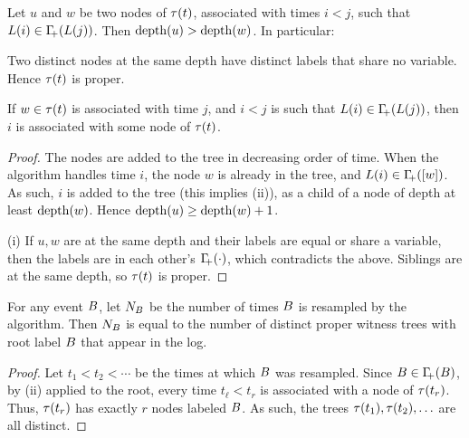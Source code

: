 \begin{lemma}
    Let $u$ and $w$ be two nodes of $\WTreeX{t}$, associated with times
    $i<j$, such that $\ELogX{i} \in \NbrCX{\ELogX{j}}$. Then
    $\nodeDepthX{u} > \nodeDepthX{w}$. In particular:
    \begin{compactenumi}
        \item Two distinct nodes at the same depth have distinct
        labels that share no variable. Hence $\WTreeX{t}$ is proper.

        \item If $w \in \WTreeX{t}$ is associated with time $j$, and
        $i < j$ is such that $\ELogX{i} \in \NbrCX{\ELogX{j}}$, then $i$
        is associated with some node of $\WTreeX{t}$.
    \end{compactenumi}
\end{lemma}

\begin{proof}
    The nodes are added to the tree in decreasing order of time. When
    the algorithm handles time $i$, the node $w$ is already in the
    tree, and $\ELogX{i} \in \NbrCX{\LabelX{w}}$. As such, $i$ is
    added to the tree (this implies (ii)), as a child of a node of
    depth at least $\nodeDepthX{w}$. Hence
    $\nodeDepthX{u} \geq \nodeDepthX{w}+1$.

    (i) If $u, w$ are at the same depth and their labels are equal
    or share a variable, then the labels are in each other's
    $\NbrCX{\cdot}$, which contradicts the above. Siblings are at the
    same depth, so $\WTreeX{t}$ is proper.
\end{proof}

\begin{lemma}
    For any event ${B}$, let $N_{{B}}$ be the number of
    times ${B}$ is resampled by the algorithm. Then
    $N_{{B}}$ is equal to the number of distinct proper
    witness trees with root label ${B}$ that appear in the log.
\end{lemma}

\begin{proof}
    Let $t_1 < t_2 < \cdots$ be the times at which ${B}$ was
    resampled. Since $\BEvent \in \NbrCX{\BEvent}$, by
     (ii) applied to the root, every time
    $t_\ell < t_r$ is associated with a node of $\WTreeX{t_r}$. Thus,
    $\WTreeX{t_r}$ has exactly $r$ nodes labeled ${B}$. As such,
    the trees $\WTreeX{t_1}, \WTreeX{t_2}, \ldots$ are all distinct.
\end{proof}

